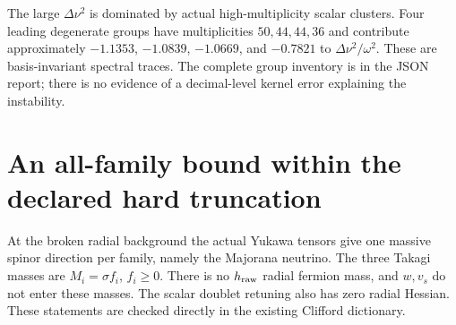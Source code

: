 \documentclass[11pt]{article}
\begin{document}
The large $\Delta\nu^2$ is dominated by actual high-multiplicity scalar
clusters. Four leading degenerate groups have multiplicities
$50,44,44,36$ and contribute approximately
$-1.1353$, $-1.0839$, $-1.0669$, and $-0.7821$ to $\Delta\nu^2/\omega^2$.
These are basis-invariant spectral traces. The complete group inventory
is in the JSON report; there is no evidence of a decimal-level kernel
error explaining the instability.

\section{An all-family bound within the declared hard truncation}
At the broken radial background the actual Yukawa tensors give one
massive spinor direction per family, namely the Majorana neutrino.
The three Takagi masses are $M_i=\sigma f_i$, $f_i\geq0$.
There is no $h_{\rm raw}$ radial fermion mass, and $w,v_s$ do not enter
these masses. The scalar doublet retuning also has zero radial Hessian.
These statements are checked directly in the existing Clifford dictionary.
\end{document}
